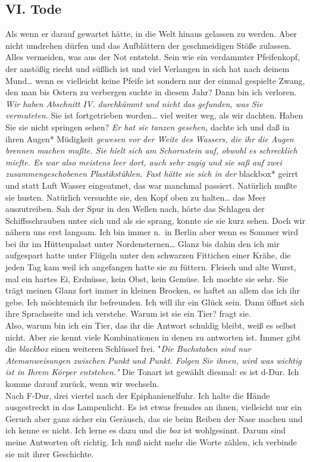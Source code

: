 \documentclass[
]{article}
\author{}
\date{\vspace{-2.5em}}
\begin{document}
\subsection{VI. Tode}\label{vi.-tode}

Als wenn er darauf gewartet hätte, in die Welt hinaus gelassen zu
werden. Aber nicht umdrehen dürfen und das Aufblättern der geschmeidigen
Stöße zulassen. Alles vermeiden, was aus der Not entsteht. Sein wie ein
verdammter Pfeifenkopf, der anstößig riecht und süßlich ist und viel
Verlangen in sich hat nach deinem Mund\ldots{} wenn es vielleicht keine
Pfeife ist sondern nur der einmal gespielte Zwang, den man bis Ostern zu
verbergen suchte in diesem Jahr? Dann bin ich verloren.\\
\emph{Wir haben Abschnitt IV. durchkämmt und nicht das gefunden, was Sie
vermuteten. }Sie ist fortgetrieben worden\ldots{} viel weiter weg, als
wir dachten. Haben Sie sie nicht springen sehen? \emph{Er hat sie tanzen
gesehen, }dachte ich und daß in ihren Augen* Müdigkeit \emph{gewesen vor
der Weite des Wassers, die ihr die Augen brennen machen mußte. Sie hielt
sich am Schornstein auf, obwohl es schrecklich miefte. Es war also
meistens leer dort, auch sehr zugig und sie saß auf zwei
zusammengeschobenen Plastikstühlen. Fast hätte sie sich in der
}blackbox* geirrt und statt Luft Wasser eingeatmet, das war manchmal
passiert. Natürlich mußte sie husten. Natürlich versuchte sie, den Kopf
oben zu halten\ldots{} das Meer auszutreiben. Sah der Spur in den Wellen
nach, hörte das Schlagen der Schiffsschrauben unter sich und als sie
sprang, konnte sie sie kurz sehen. Doch wir nähern uns erst langsam. Ich
bin immer n.~in Berlin aber wenn es Sommer wird bei ihr im Hüttenpalast
unter Nordensternen\ldots{} Glanz bis dahin den ich mir aufgespart hatte
unter Flügeln unter den schwarzen Fittichen einer Krähe, die jeden Tag
kam weil ich angefangen hatte sie zu füttern. Fleisch und alte Wurst,
mal ein hartes Ei, Erdnüsse, kein Obst, kein Gemüse. Ich mochte sie
sehr. Sie trägt meinen Glanz fort immer in kleinen Brocken, es haftet an
allem das ich ihr gebe. Ich möchtemich ihr befreunden. Ich will ihr ein
Glück sein. Dann öffnet sich ihre Sprachseite und ich verstehe. Warum
ist sie ein Tier? fragt sie.\\
Also, warum bin ich ein Tier, das ihr die Antwort schuldig bleibt, weiß
es selbst nicht. Aber sie kennt viele Kombinationen in denen zu
antworten ist. Immer gibt die \emph{blackbox} einen weiteren Schlüssel
frei. "\emph{Die Buchstaben sind nur Atemanweisungen zwischen Punkt und
Punkt. Folgen Sie ihnen, wird was wichtig ist in Ihrem Körper
entstehen."} Die Tonart ist gewählt diesmal: es ist d-Dur. Ich komme
darauf zurück, wenn wir wechseln.\\
Nach F-Dur, drei viertel nach der Epiphanienelfuhr. Ich halte die Hände
ausgestreckt in das Lampenlicht. Es ist etwas fremdes an ihnen,
vielleicht nur ein Geruch aber ganz sicher ein Geräusch, das sie beim
Reiben der Nase machen und ich kenne es nicht. Ich lerne es dazu und die
\emph{box} ist wohlgesinnt. Darum sind meine Antworten oft richtig. Ich
muß nicht mehr die Worte zählen, ich verbinde sie mit ihrer Geschichte.
\end{document}
